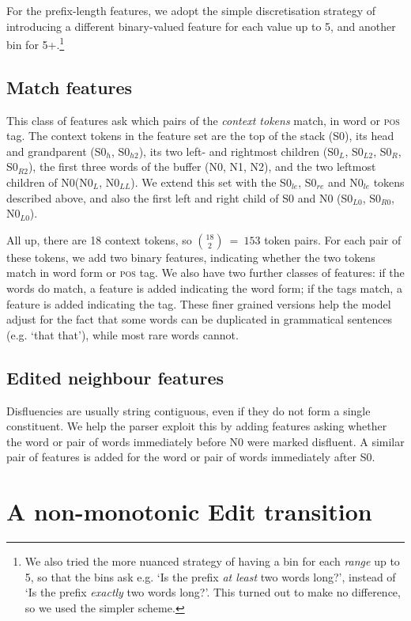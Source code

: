 \documentclass[11pt,letterpaper]{article}
\newcommand{\pos}{\textsc{pos}\xspace}
\newcommand{\szero}{S0\xspace}
\newcommand{\nzero}{N0\xspace}
\newcommand{\szeroh}{S0$_h$\xspace}
\newcommand{\szerohh}{S0$_{h2}$\xspace}
\newcommand{\szeroL}{S0$_L$\xspace}
\newcommand{\szeroLL}{S0$_{L2}$\xspace}
\newcommand{\szeroR}{S0$_R$\xspace}
\newcommand{\szeroRR}{S0$_{R2}$\xspace}
\newcommand{\szeroLzero}{S0$_{L0}$\xspace}
\newcommand{\szeroRzero}{S0$_{R0}$\xspace}
\newcommand{\nzeroL}{N0$_L$\xspace}
\newcommand{\nzeroLL}{N0$_{LL}$\xspace}
\newcommand{\nzeroLzero}{N0$_{L0}$\xspace}
\newcommand{\szeroRedge}{S0$_{re}$\xspace}
\newcommand{\szeroLedge}{S0$_{le}$\xspace}
\newcommand{\nzeroLedge}{N0$_{le}$\xspace}
\begin{document}
For the prefix-length features, we adopt the simple discretisation strategy of
introducing a different binary-valued feature for each value up to 5, and another
bin for 5+.\footnote{We also tried the more nuanced strategy of having a bin for each
\emph{range} up to 5, so that the bins ask e.g. `Is the prefix \emph{at
least} two words long?', instead of `Is the prefix \emph{exactly} two words long?'.
This turned out to make no difference, so we used the simpler scheme.}

\subsection{Match features}

This class of features ask which pairs of the \emph{context tokens} match, in
word or \pos tag.  The context tokens in the \citet{zhang:11} feature set
are the top of the stack (\szero), its head and grandparent (\szeroh, \szerohh),
its two left- and rightmost children (\szeroL, \szeroLL, \szeroR, \szeroRR), the
first three words of the buffer (\nzero, N1, N2), and the two leftmost children
of \nzero (\nzeroL, \nzeroLL).
We extend this set with the \szeroLedge, \szeroRedge and \nzeroLedge tokens
described above, and also the first left and right child of \szero and \nzero
(\szeroLzero, \szeroRzero, \nzeroLzero).

All up, there are 18 context tokens, so ${18 \choose 2}~=~153$ token pairs.
For each pair of these tokens, we add two binary features, indicating whether the
two tokens match in word form or \pos tag.  We also have two further classes of
features: if the words do match, a feature is added indicating the word form;
if the tags match, a feature is added indicating the tag. These finer grained
versions help the model adjust for the fact that some words can be duplicated
in grammatical sentences (e.g. `that that'), while most rare words cannot.

\subsection{Edited neighbour features}

Disfluencies are usually
string contiguous, even if they do not form a single constituent.  We help the
parser exploit this by adding features asking whether the word or pair of words
immediately before \nzero were marked disfluent. A similar pair of features is
added for the word or pair of words immediately after \szero.

\section{A non-monotonic Edit transition}
\end{document}
